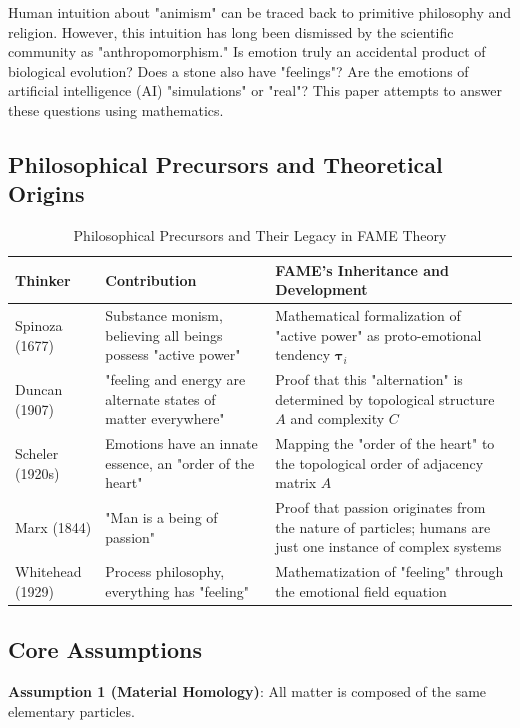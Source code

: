 \documentclass[12pt,a4paper]{article}
\theoremstyle{plain}
\newcommand{\ve}[1]{\bm{#1}}                    %
\newcommand{\tauvec}{\ve{\tau}}                   %
\begin{document}
Human intuition about "animism" can be traced back to primitive philosophy and religion. However, this intuition has long been dismissed by the scientific community as "anthropomorphism." Is emotion truly an accidental product of biological evolution? Does a stone also have "feelings"? Are the emotions of artificial intelligence (AI) "simulations" or "real"? This paper attempts to answer these questions using mathematics.

\subsection{Philosophical Precursors and Theoretical Origins}

\begin{table}[h]
\centering
\caption{Philosophical Precursors and Their Legacy in FAME Theory}
\begin{tabular}{p{4cm}p{5cm}p{5cm}}
\toprule
\textbf{Thinker} & \textbf{Contribution} & \textbf{FAME's Inheritance and Development} \\
\midrule
Spinoza (1677) & Substance monism, believing all beings possess "active power" & Mathematical formalization of "active power" as proto-emotional tendency $\tauvec_i$ \\
Duncan (1907) & "feeling and energy are alternate states of matter everywhere" & Proof that this "alternation" is determined by topological structure $A$ and complexity $C$ \\
Scheler (1920s) & Emotions have an innate essence, an "order of the heart" & Mapping the "order of the heart" to the topological order of adjacency matrix $A$ \\
Marx (1844) & "Man is a being of passion" & Proof that passion originates from the nature of particles; humans are just one instance of complex systems \\
Whitehead (1929) & Process philosophy, everything has "feeling" & Mathematization of "feeling" through the emotional field equation \\
\bottomrule
\end{tabular}
\end{table}

\subsection{Core Assumptions}

\textbf{Assumption 1 (Material Homology)}: All matter is composed of the same elementary particles.
\end{document}
